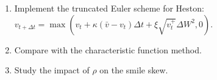 \begin{exercise}
\begin{enumerate}
    \item Implement the truncated Euler scheme for Heston:
          $v_{t+\Delta t} = \max(v_t + \kappa(\bar{v} - v_t)\Delta t
          + \xi\sqrt{v_t^+}\Delta W^2, 0)$.
    \item Compare with the characteristic function method.
    \item Study the impact of $\rho$ on the smile skew.
\end{enumerate}
\end{exercise}

